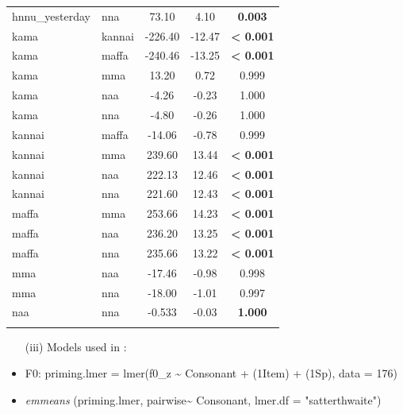 \documentclass[output=paper]{langscibook}
\begin{document}
\begin{paperappendix}
{\begin{longtable}{l @{  vs. } l S[table-format=-3.2] S[table-format=-2.3] S[table-format=<1.3]}
		hnnu\_yesterday  &  nna & 73.10 & 4.10 &  \bfseries 0.003\\
		kama  &  kannai & -226.40 & -12.47 &  \bfseries < 0.001\\
		kama  &  maffa & -240.46 & -13.25 &  \bfseries < 0.001\\
		kama  &  mma & 13.20 & 0.72 & 0.999\\
		kama  &  naa & -4.26 & -0.23 & 1.000\\
		kama  &  nna & -4.80 & -0.26 & 1.000\\
		kannai  &  maffa & -14.06 & -0.78 & 0.999\\
		kannai  &  mma & 239.60 & 13.44 &  \bfseries < 0.001\\
		kannai  &  naa & 222.13 & 12.46 &  \bfseries < 0.001\\
		kannai  &  nna & 221.60 & 12.43 &  \bfseries < 0.001\\
		maffa  &  mma & 253.66 & 14.23 &  \bfseries < 0.001\\
		maffa  &  naa & 236.20 & 13.25 &  \bfseries < 0.001\\
		maffa  &  nna & 235.66 & 13.22 &  \bfseries < 0.001\\
		mma  &  naa & -17.46 & -0.98 & 0.998\\
		mma  &  nna & -18.00 & -1.01 & 0.997\\
		naa  &  nna & -0.533 & -0.03 &  \bfseries 1.000\\
		\lspbottomrule
\end{longtable}}

\clearpage
\begin{itemize}
\item[(iii)] Models used in :
\item
F0:
priming.lmer = lmer(f0\_z {\textasciitilde} Consonant + (1{\textbar}Item) + (1{\textbar}Sp), data = 176)
\item
\textit{emmeans} (priming.lmer, pairwise{\textasciitilde} Consonant, lmer.df = "satterthwaite")
\end{itemize}


\end{paperappendix}
\end{document}
